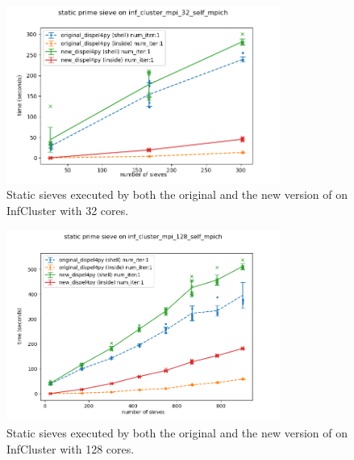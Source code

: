 \begin{figure}[h]
\centering
    \includegraphics[width=0.8\textwidth]{figures/sieve_static_32}
\caption{Static sieves executed by both the original and the new version of \dpy on InfCluster with 32 cores.}
\label{fig:sieve_static_32}
\end{figure}

\begin{figure}[h]
\centering
    \includegraphics[width=0.8\textwidth]{figures/sieve_static_128}
\caption{Static sieves executed by both the original and the new version of \dpy on InfCluster with 128 cores.}
\label{fig:sieve_static_128}
\end{figure}

